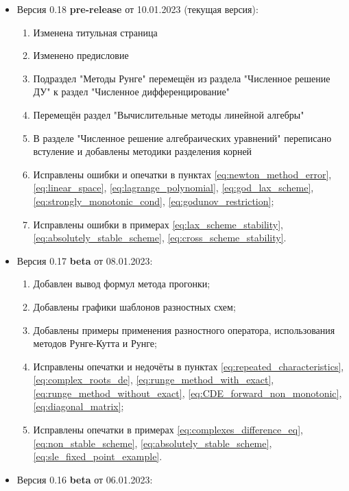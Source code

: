 \documentclass{article}
\begin{document}

\begin{itemize}[nosep]
\item Версия 0.18 \textbf{pre-release} от 10.01.2023 (текущая версия):
	\begin{enumerate}[nosep]
		\item Изменена титульная страница
		\item Изменено предисловие
		\item Подраздел "Методы Рунге" перемещён из раздела
			"Численное решение ДУ" к раздел "Численное
			дифференцирование"
		\item Перемещён раздел "Вычислительные методы линейной алгебры"
		\item В разделе "Численное решение алгебраических уравнений"
			переписано встуление и добавлены методики разделения
			корней
		\item Исправлены ошибки и опечатки в пунктах
			\eqref{eq:newton_method_error},
			\eqref{eq:linear_space},
			\eqref{eq:lagrange_polynomial}, 
			\eqref{eq:god_lax_scheme},
			\eqref{eq:strongly_monotonic_cond},
			\eqref{eq:godunov_restriction};
		\item Исправлены ошибки в примерах
			\eqref{eq:lax_scheme_stability},
			\eqref{eq:absolutely_stable_scheme},
			\eqref{eq:cross_scheme_stability}.
	\end{enumerate}
\item Версия 0.17 \textbf{beta} от 08.01.2023:
	\begin{enumerate}[nosep]
		\item Добавлен вывод формул метода прогонки;
		\item Добавлены графики шаблонов разностных схем;
		\item Добавлены примеры применения разностного оператора,
			использования методов Рунге-Кутта и Рунге;
		\item Исправлены опечатки и недочёты в пунктах
			\eqref{eq:repeated_characteristics},
			\eqref{eq:complex_roots_de},
			\eqref{eq:runge_method_with_exact},
			\eqref{eq:runge_method_without_exact},
			\eqref{eq:CDE_forward_non_monotonic},
			\eqref{eq:diagonal_matrix};
		\item Исправлены опечатки в примерах
			\eqref{eq:complexes_difference_eq},
			\eqref{eq:non_stable_scheme},
			\eqref{eq:absolutely_stable_scheme},
			\eqref{eq:sle_fixed_point_example}.
	\end{enumerate}
\item Версия 0.16 \textbf{beta} от 06.01.2023:

\end{itemize}
\end{document}
